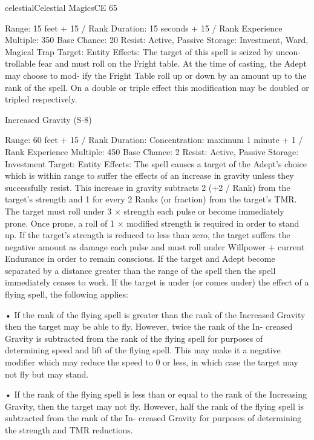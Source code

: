 \begin{College}[1.3]{celestial}{Celestial Magics}{CE}
65 

Range: 15 feet + 15 / Rank 
Duration: 15 seconds + 15 / Rank 
Experience Multiple: 350 
Base Chance: 20%
Resist: Active, Passive 
Storage: Investment, Ward, Magical Trap 
Target: Entity 
Effects: The target of this spell is seized by uncon-
trollable  fear  and  must  roll  on  the  Fright  table.  At 
the time of casting, the Adept may choose to mod-
ify the Fright Table roll up or down by an amount 
up  to  the  rank  of  the  spell.  On  a  double  or  triple 
effect  this  modification  may  be  doubled  or  tripled 
respectively. 

Increased Gravity (S-8) 

Range: 60 feet + 15 / Rank 
Duration: Concentration: maximum 1 minute + 1 / 
Rank 
Experience Multiple: 450 
Base Chance: 2%
Resist: Active, Passive 
Storage: Investment 
Target: Entity 
Effects:  The  spell  causes  a  target  of  the  Adept’s 
choice which is within range to suffer the effects of 
an  increase  in  gravity  unless  they  successfully 
resist.  This  increase  in  gravity  subtracts  2  (+2  / 
Rank) from the target’s strength and 1 for every 2 
Ranks  (or  fraction)  from  the  target’s  TMR.  The 
target  must  roll  under  3  ×  strength  each  pulse  or 
become immediately prone. Once prone, a roll of 1 
×  modified  strength  is  required  in  order  to  stand 
up.  If  the  target’s  strength  is  reduced  to  less  than 
zero,  the  target  suffers  the  negative  amount  as 
damage each pulse and must roll under Willpower 
+ current Endurance in order to remain conscious. 
If  the  target  and  Adept  become  separated  by  a 
distance greater than the range of the spell then the 
spell  immediately  ceases  to  work.  If  the  target  is 
under (or comes under) the effect of a flying spell, 
the following applies:  

•  If  the  rank  of  the  flying  spell  is  greater  than  the 
rank  of  the  Increased  Gravity  then  the  target  may 
be  able  to  fly.  However,  twice  the  rank  of  the  In-
creased  Gravity  is  subtracted  from  the  rank  of  the 
flying spell for purposes of determining speed and 
lift of the flying spell. This may make it a negative 
modifier which may reduce the speed to 0 or  less, 
in which case the target may not fly but may stand.  

• If the rank of the flying spell is less than or equal 
to  the  rank  of  the  Increasing  Gravity,  then  the 
target  may  not  fly.  However,  half  the  rank  of  the 
flying  spell  is  subtracted  from  the  rank  of  the  In-
creased  Gravity  for  purposes  of  determining  the 
strength and TMR reductions. 


\end{College}
